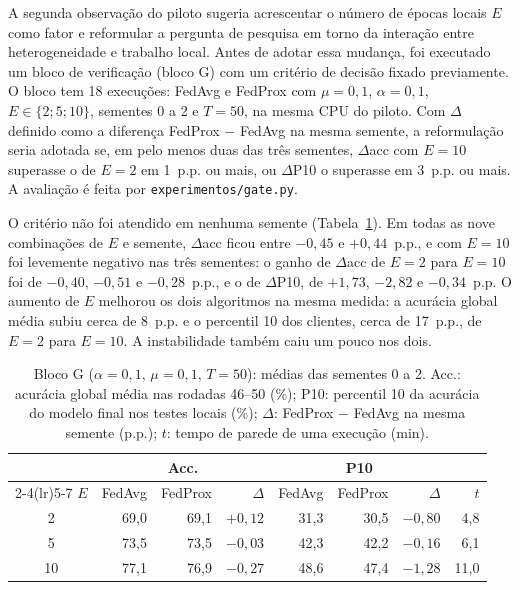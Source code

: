 A segunda observação do piloto sugeria acrescentar o número de épocas locais $E$ como fator e reformular a pergunta de pesquisa em torno da interação entre heterogeneidade e trabalho local. Antes de adotar essa mudança, foi executado um bloco de verificação (bloco G) com um critério de decisão fixado previamente. O bloco tem 18 execuções: FedAvg e FedProx com $\mu = 0{,}1$, $\alpha = 0{,}1$, $E \in \{2; 5; 10\}$, sementes 0 a 2 e $T = 50$, na mesma CPU do piloto. Com $\Delta$ definido como a diferença FedProx $-$ FedAvg na mesma semente, a reformulação seria adotada se, em pelo menos duas das três sementes, $\Delta$acc com $E = 10$ superasse o de $E = 2$ em 1~p.p. ou mais, ou $\Delta$P10 o superasse em 3~p.p. ou mais. A avaliação é feita por \texttt{experimentos/gate.py}.

O critério não foi atendido em nenhuma semente (Tabela~\ref{tab:gate}). Em todas as nove combinações de $E$ e semente, $\Delta$acc ficou entre $-0{,}45$ e $+0{,}44$~p.p., e com $E = 10$ foi levemente negativo nas três sementes: o ganho de $\Delta$acc de $E = 2$ para $E = 10$ foi de $-0{,}40$, $-0{,}51$ e $-0{,}28$~p.p., e o de $\Delta$P10, de $+1{,}73$, $-2{,}82$ e $-0{,}34$~p.p. O aumento de $E$ melhorou os dois algoritmos na mesma medida: a acurácia global média subiu cerca de 8~p.p. e o percentil 10 dos clientes, cerca de 17~p.p., de $E = 2$ para $E = 10$. A instabilidade também caiu um pouco nos dois.

\begin{table}[ht]
    \centering\small
    \caption{Bloco G ($\alpha = 0{,}1$, $\mu = 0{,}1$, $T = 50$): médias das sementes 0 a 2. Acc.: acurácia global média nas rodadas 46--50 (\%); P10: percentil 10 da acurácia do modelo final nos testes locais (\%); $\Delta$: FedProx $-$ FedAvg na mesma semente (p.p.); $t$: tempo de parede de uma execução (min).}
    \label{tab:gate}
    \setlength{\tabcolsep}{3.5pt}
    \begin{tabular}{@{}crrrrrrr@{}}
        \toprule
        & \multicolumn{3}{c}{Acc.} & \multicolumn{3}{c}{P10} & \\
        \cmidrule(lr){2-4}\cmidrule(lr){5-7}
        $E$ & FedAvg & FedProx & $\Delta$ & FedAvg & FedProx & $\Delta$ & $t$ \\
        \midrule
        2  & 69{,}0 & 69{,}1 & $+0{,}12$ & 31{,}3 & 30{,}5 & $-0{,}80$ & 4{,}8 \\
        5  & 73{,}5 & 73{,}5 & $-0{,}03$ & 42{,}3 & 42{,}2 & $-0{,}16$ & 6{,}1 \\
        10 & 77{,}1 & 76{,}9 & $-0{,}27$ & 48{,}6 & 47{,}4 & $-1{,}28$ & 11{,}0 \\
        \bottomrule
    \end{tabular}
\end{table}

